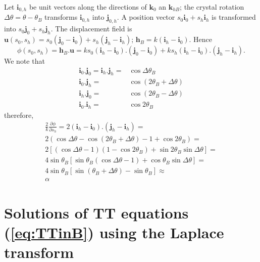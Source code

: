 \documentclass{iucr}
\begin{document}
Let $\textbf{i}_{0,h}$ be unit vectors along the directions of $\textbf{k}_0$ an $\textbf{k}_{hB}$; the crystal rotation $\Delta\theta=\theta-\theta_B$ transforms $\textbf{i}_{0,h}$ into $\textbf{j}_{0,h}$. A position vector $s_0\textbf{i}_0+s_h\textbf{i}_h$ is transformed into $s_0\textbf{j}_0+s_h\textbf{j}_h$. The displacement field is $\textbf{u}(s_0,s_h)=s_0(\textbf{j}_0-\textbf{i}_0)+ s_h(\textbf{j}_h-\textbf{i}_h)$; $\textbf{h}_B=k(\textbf{i}_h-\textbf{i}_0)$. Hence
\begin{equation}
    \phi(s_0,s_h)=\textbf{h}_B.\textbf{u}=k s_0(\textbf{i}_h-\textbf{i}_0).(\textbf{j}_0-\textbf{i}_0) + 
    k s_h(\textbf{i}_h-\textbf{i}_0).(\textbf{j}_h-\textbf{i}_h).
\end{equation}
We note that 
\begin{subequations}
\begin{align}
    \textbf{i}_0.\textbf{j}_0=\textbf{i}_h.\textbf{j}_h=&\cos\Delta\theta_B \\
    \textbf{i}_0.\textbf{j}_h=&\cos(2\theta_B +\Delta\theta) \\
    \textbf{i}_h.\textbf{j}_0=&\cos(2\theta_B -\Delta\theta) \\
    \textbf{i}_0.\textbf{i}_h=&\cos2\theta_B
\end{align}
\end{subequations}
therefore, 
\begin{subequations}
\begin{align}
    \frac{2}{k}\frac{\partial\phi}{\partial s_h} =  2(\textbf{i}_h-\textbf{i}_0).(\textbf{j}_h-\textbf{i}_h)= \nonumber\\
    2(\cos\Delta\theta - \cos(2\theta_B+\Delta\theta)-1+\cos2\theta_B)= \nonumber\\
    2[(\cos\Delta\theta-1)(1-\cos2\theta_B)+\sin2\theta_B\sin\Delta\theta]=\nonumber\\
    4 \sin\theta_B[\sin\theta_B(\cos\Delta\theta-1)+\cos\theta_B\sin\Delta\theta]=\nonumber\\
    4 \sin\theta_B[\sin(\theta_B+\Delta\theta)-\sin\theta_B]\approx\nonumber\\
    \alpha
\end{align}
\end{subequations}



\section{Solutions of TT equations (\ref{eq:TTinB}) using the Laplace transform}
\label{appendix:laplace}
\end{document}
